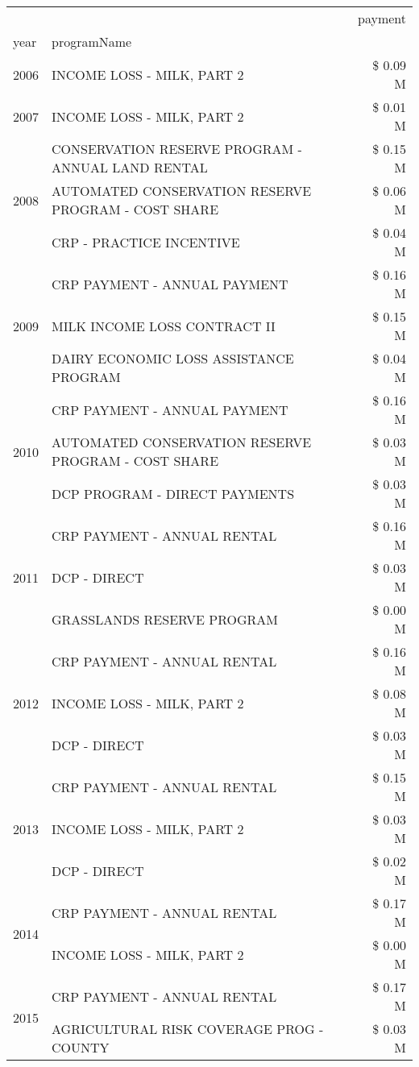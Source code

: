 \begin{tabular}{llr}
\toprule
 &  & payment \\
year & programName &  \\
\midrule
2006 & INCOME LOSS - MILK, PART 2 & \$ 0.09 M \\
\cline{1-3}
2007 & INCOME LOSS - MILK, PART 2 & \$ 0.01 M \\
\cline{1-3}
\multirow[t]{3}{*}{2008} & CONSERVATION RESERVE PROGRAM - ANNUAL LAND RENTAL & \$ 0.15 M \\
 & AUTOMATED CONSERVATION RESERVE PROGRAM - COST SHARE & \$ 0.06 M \\
 & CRP - PRACTICE INCENTIVE & \$ 0.04 M \\
\cline{1-3}
\multirow[t]{3}{*}{2009} & CRP PAYMENT - ANNUAL PAYMENT & \$ 0.16 M \\
 & MILK INCOME LOSS CONTRACT II & \$ 0.15 M \\
 & DAIRY ECONOMIC LOSS ASSISTANCE PROGRAM & \$ 0.04 M \\
\cline{1-3}
\multirow[t]{3}{*}{2010} & CRP PAYMENT - ANNUAL PAYMENT & \$ 0.16 M \\
 & AUTOMATED CONSERVATION RESERVE PROGRAM - COST SHARE & \$ 0.03 M \\
 & DCP PROGRAM - DIRECT PAYMENTS & \$ 0.03 M \\
\cline{1-3}
\multirow[t]{3}{*}{2011} & CRP PAYMENT - ANNUAL RENTAL & \$ 0.16 M \\
 & DCP - DIRECT & \$ 0.03 M \\
 & GRASSLANDS RESERVE PROGRAM & \$ 0.00 M \\
\cline{1-3}
\multirow[t]{3}{*}{2012} & CRP PAYMENT - ANNUAL RENTAL & \$ 0.16 M \\
 & INCOME LOSS - MILK, PART 2 & \$ 0.08 M \\
 & DCP - DIRECT & \$ 0.03 M \\
\cline{1-3}
\multirow[t]{3}{*}{2013} & CRP PAYMENT - ANNUAL RENTAL & \$ 0.15 M \\
 & INCOME LOSS - MILK, PART 2 & \$ 0.03 M \\
 & DCP - DIRECT & \$ 0.02 M \\
\cline{1-3}
\multirow[t]{2}{*}{2014} & CRP PAYMENT - ANNUAL RENTAL & \$ 0.17 M \\
 & INCOME LOSS - MILK, PART 2 & \$ 0.00 M \\
\cline{1-3}
\multirow[t]{2}{*}{2015} & CRP PAYMENT - ANNUAL RENTAL & \$ 0.17 M \\
 & AGRICULTURAL RISK COVERAGE PROG - COUNTY & \$ 0.03 M \\

\end{tabular}
